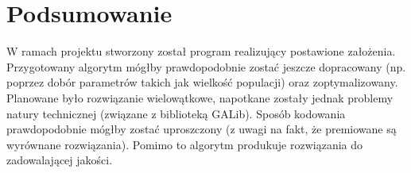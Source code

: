 \documentclass[11pt,a4paper,oneside]{article}
\begin{document}
\section{Podsumowanie}
W ramach projektu stworzony został program realizujący postawione założenia. Przygotowany algorytm mógłby prawdopodobnie zostać jeszcze dopracowany (np. poprzez dobór parametrów takich jak wielkość populacji) oraz zoptymalizowany. Planowane było rozwiązanie wielowątkowe, napotkane zostały jednak problemy natury technicznej (związane z biblioteką GALib). Sposób kodowania prawdopodobnie mógłby zostać uproszczony (z uwagi na fakt, że premiowane są wyrównane rozwiązania). Pomimo to algorytm produkuje rozwiązania do zadowalającej jakości.
\end{document}
